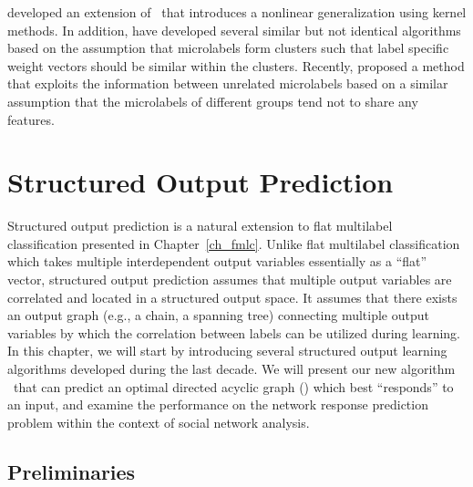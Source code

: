 {\citet{Argyriou08convex} developed an extension of \mtl\ that introduces a nonlinear generalization using kernel methods.
In addition, \citet{Argyriou08an,Jacob09cluster} have developed several similar but not identical algorithms based on the assumption that microlabels form clusters such that label specific weight vectors should be similar within the clusters.
Recently, \citet{Paredes12exploit} proposed a method that exploits the information between unrelated microlabels based on a similar assumption that the microlabels of different groups tend not to share any features.




%
%
\chapter{Structured Output Prediction} \label{ch_sop}

Structured output prediction is a natural extension to flat multilabel classification presented in Chapter~\ref{ch_fmlc}.
Unlike flat multilabel classification which takes multiple interdependent output variables essentially as a ``flat'' vector, structured output prediction assumes that multiple output variables are correlated and located in a structured output space.
It assumes that there exists an output graph (e.g., a chain, a spanning tree) connecting multiple output variables by which the correlation between labels can be utilized during learning.
In this chapter, we will start by introducing several structured output learning algorithms developed during the last decade.
We will present our new algorithm \spin\ that can predict an optimal directed acyclic graph (\daggraph) which best ``responds'' to an input, and examine the performance on the network response prediction problem within the context of social network analysis.



%
%
\section{Preliminaries}

}

